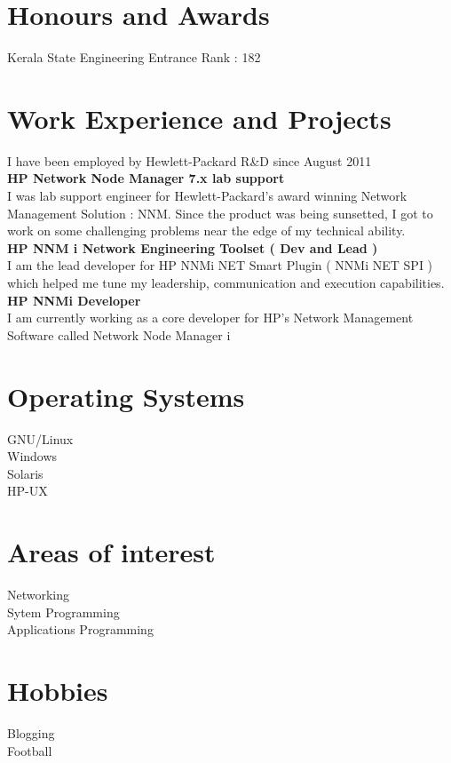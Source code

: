 \documentclass[line,margin]{res}
\begin{document}
\begin{resume}
\section{Honours and Awards}
Kerala State Engineering Entrance Rank : 182\\

\section{Work Experience and Projects}

I have been employed by Hewlett-Packard R\&D since August 2011\\

{\bf HP Network Node Manager 7.x lab support}\\
I was lab support engineer for Hewlett-Packard's award winning Network Management Solution : NNM. Since the product was being sunsetted, I got to work on some challenging problems near the edge of my technical ability.\\

{\bf HP NNM i Network Engineering Toolset ( Dev and Lead )}\\
I am the lead developer for HP NNMi NET Smart Plugin ( NNMi NET SPI ) which helped me tune my leadership, communication and execution capabilities.\\

{\bf HP NNMi Developer}\\
I am currently working as a core developer for HP's Network Management Software called Network Node Manager i\\

\section{Operating Systems}
GNU/Linux\\
Windows\\
Solaris\\
HP-UX\\

\section{Areas of interest}
Networking\\
Sytem Programming\\
Applications Programming\\

\section{Hobbies}
Blogging\\
Football\\


\end{resume}
\end{document}
